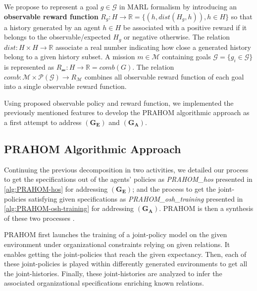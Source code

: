 \documentclass[runningheads]{llncs}
\newcounter{relation}
\begin{document}
We propose to represent a goal $g \in \mathcal{G}$ in MARL formalism by introducing an \textbf{observable reward function} $R_{g}: H \rightarrow \mathbb{R} = \{(h, dist(H_g,h)), h \in H\}$ so that a history generated by an agent $h \in H$ be associated with a positive reward if it belongs to the observable/expected $H_g$ or negative otherwise. The relation $dist: H \times H \rightarrow \mathbb{R}$ associate a real number indicating how close a generated history belong to a given history subset.
A mission $m \in \mathcal{M}$ containing goals $\mathcal{G} = \{g_i \in \mathcal{G}\}$ is represented as $R_{\mathcal{m}}: H \rightarrow \mathbb{R} = comb(G)$. The relation $comb: \mathcal{M} \times \mathcal{P}(\mathcal{G}) \rightarrow R_{\mathcal{M}}$ combines all observable reward function of each goal into a single observable reward function.

Using proposed observable policy and reward function, we implemented the previously mentioned features to develop the PRAHOM algorithmic approach as a first attempt to address $(\mathbf{G_E})$ and $(\mathbf{G_A})$.


\subsection{PRAHOM Algorithmic Approach}

Continuing the previous decomposition in two activities, we detailed our process to get the specifications out of the agents' policies as \emph{PRAHOM\_hos} presented in \autoref{alg:PRAHOM-hos} for addressing $(\mathbf{G_E})$; and the process to get the joint-policies satisfying given specifications as \emph{PRAHOM\_osh\_training} presented in \autoref{alg:PRAHOM-osh-training} for addressing $(\mathbf{G_A})$. PRAHOM is then a synthesis of these two processes
\footnotemark[1].


PRAHOM first launches the training of a joint-policy model on the given environment under organizational constraints relying on given relations. It enables getting the joint-policies that reach the given expectancy. Then, each of these joint-policies is played within differently generated environments to get all the joint-histories. Finally, these joint-histories are analyzed to infer the associated organizational specifications enriching known relations.
\end{document}
